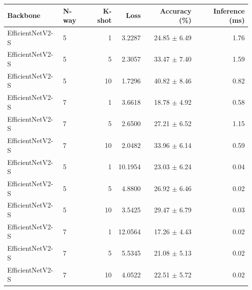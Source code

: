 \begin{tabular}{llrrrr}
Backbone & N-way & K-shot & Loss & Accuracy (\%) & Inference (ms) \\ \hline
EfficientNetV2-S & 5 & 1 & 3.2287 & 24.85 $\pm$ 6.49 & 1.76 \\
EfficientNetV2-S & 5 & 5 & 2.3057 & 33.47 $\pm$ 7.40 & 1.59 \\
EfficientNetV2-S & 5 & 10 & 1.7296 & 40.82 $\pm$ 8.46 & 0.82 \\
EfficientNetV2-S & 7 & 1 & 3.6618 & 18.78 $\pm$ 4.92 & 0.58 \\
EfficientNetV2-S & 7 & 5 & 2.6500 & 27.21 $\pm$ 6.52 & 1.15 \\
EfficientNetV2-S & 7 & 10 & 2.0482 & 33.96 $\pm$ 6.14 & 0.59 \\
EfficientNetV2-S & 5 & 1 & 10.1954 & 23.03 $\pm$ 6.24 & 0.04 \\
EfficientNetV2-S & 5 & 5 & 4.8800 & 26.92 $\pm$ 6.46 & 0.02 \\
EfficientNetV2-S & 5 & 10 & 3.5425 & 29.47 $\pm$ 6.79 & 0.03 \\
EfficientNetV2-S & 7 & 1 & 12.0564 & 17.26 $\pm$ 4.43 & 0.02 \\
EfficientNetV2-S & 7 & 5 & 5.5345 & 21.08 $\pm$ 5.13 & 0.02 \\
EfficientNetV2-S & 7 & 10 & 4.0522 & 22.51 $\pm$ 5.72 & 0.02 \\
\end{tabular}
